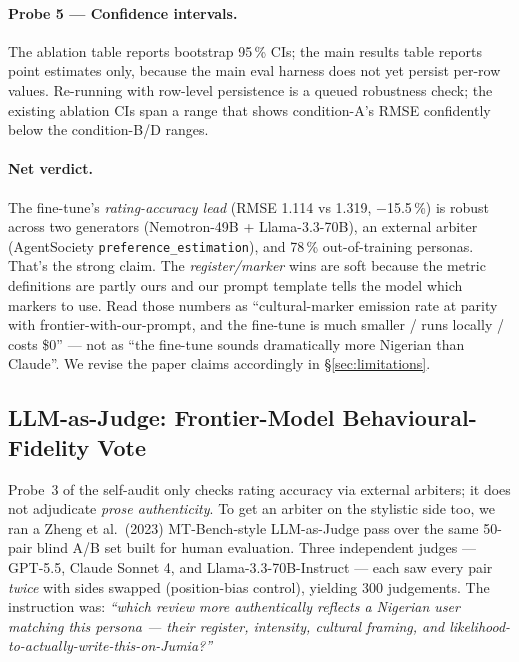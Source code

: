 \documentclass[sigconf,nonacm,balance]{acmart}
\begin{document}
\paragraph{Probe 5 --- Confidence intervals.} The ablation table reports
bootstrap 95\,\% CIs; the main results table reports point estimates only,
because the main eval harness does not yet persist per-row values.
Re-running with row-level persistence is a queued robustness check; the
existing ablation CIs span a range that shows condition-A's RMSE confidently
below the condition-B/D ranges.

\paragraph{Net verdict.} The fine-tune's \emph{rating-accuracy lead}
(RMSE 1.114 vs 1.319, $-$15.5\,\%) is robust across two generators
(Nemotron-49B + Llama-3.3-70B), an external arbiter (AgentSociety
\texttt{preference\_estimation}), and 78\,\% out-of-training personas.
That's the strong claim. The \emph{register/marker} wins are soft
because the metric definitions are partly ours and our prompt template
tells the model which markers to use. Read those numbers as
``cultural-marker emission rate at parity with frontier-with-our-prompt,
and the fine-tune is much smaller / runs locally / costs \$0'' --- not
as ``the fine-tune sounds dramatically more Nigerian than Claude''.
We revise the paper claims accordingly in §\ref{sec:limitations}.

\subsection{LLM-as-Judge: Frontier-Model Behavioural-Fidelity Vote}
\label{sec:llm-judge}

Probe~3 of the self-audit only checks rating accuracy via external
arbiters; it does not adjudicate \emph{prose authenticity}. To get an
arbiter on the stylistic side too, we ran a Zheng et al.\ (2023)
MT-Bench-style LLM-as-Judge pass over the same 50-pair blind A/B set
built for human evaluation. Three independent
judges --- GPT-5.5, Claude Sonnet 4, and Llama-3.3-70B-Instruct ---
each saw every pair \emph{twice} with sides swapped (position-bias
control), yielding 300 judgements. The instruction was:
\emph{``which review more authentically reflects a Nigerian user matching
this persona --- their register, intensity, cultural framing, and
likelihood-to-actually-write-this-on-Jumia?''}
\end{document}
